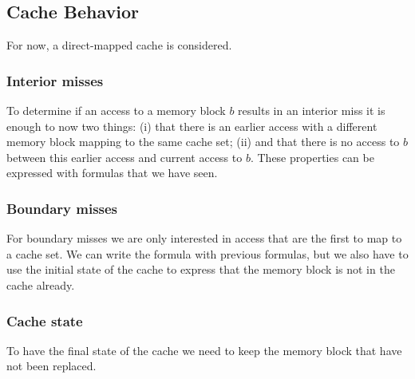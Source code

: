 \documentclass{article}
\begin{document}

\subsection{Cache Behavior}
For now, a direct-mapped cache is considered.

\subsubsection{Interior misses}
To determine if an access to a memory block $b$ results in an interior miss it is enough to now two things: (i) that there is an earlier access with a different memory block mapping to the same cache set; (ii) and that there is no access to $b$ between this earlier access and current access to $b$.
These properties can be expressed with formulas that we have seen.

\subsubsection{Boundary misses}
For boundary misses we are only interested in access that are the first to map to a cache set.
We can write the formula with previous formulas, but we also have to use the initial state of the cache to express that the memory block is not in the cache already.

\subsubsection{Cache state}
To have the final state of the cache we need to keep the memory block that have not been replaced.
\end{document}
